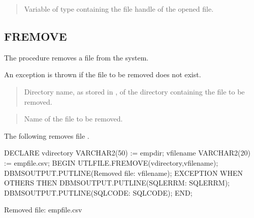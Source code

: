 \documentclass[letterpaper,10pt,english,openany,oneside]{sphinxmanual}
\begin{document}
\begin{quote}

Variable of type  containing the file handle of the opened
file.
\end{quote}


\subsection{FREMOVE}
\label{\detokenize{utl_file:fremove}}
The  procedure removes a file from the system.
\begin{quote}

\end{quote}

An exception is thrown if the file to be removed does not exist.


\begin{quote}

Directory name, as stored in , of the
directory containing the file to be removed.
\end{quote}

\begin{quote}

Name of the file to be removed.
\end{quote}


The following removes file .

%
\begin{sphinxVerbatim}[commandchars=\\\{\}]
DECLARE
    v\PYGZus{}directory     VARCHAR2(50) := \PYGZsq{}empdir\PYGZsq{};
    v\PYGZus{}filename      VARCHAR2(20) := \PYGZsq{}empfile.csv\PYGZsq{};
BEGIN
    UTL\PYGZus{}FILE.FREMOVE(v\PYGZus{}directory,v\PYGZus{}filename);
    DBMS\PYGZus{}OUTPUT.PUT\PYGZus{}LINE(\PYGZsq{}Removed file: \PYGZsq{} \textbar{}\textbar{} v\PYGZus{}filename);
    EXCEPTION
        WHEN OTHERS THEN
            DBMS\PYGZus{}OUTPUT.PUT\PYGZus{}LINE(\PYGZsq{}SQLERRM: \PYGZsq{} \textbar{}\textbar{} SQLERRM);
            DBMS\PYGZus{}OUTPUT.PUT\PYGZus{}LINE(\PYGZsq{}SQLCODE: \PYGZsq{} \textbar{}\textbar{} SQLCODE);
END;

Removed file: empfile.csv
\end{sphinxVerbatim}
\end{document}
